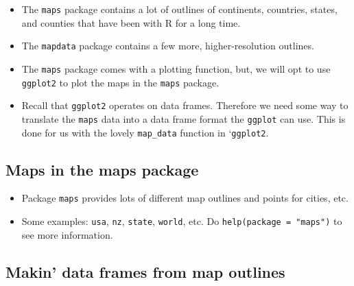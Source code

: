 \documentclass[]{book}
\providecommand{\tightlist}{%
  \setlength{\itemsep}{0pt}\setlength{\parskip}{0pt}}
\theoremstyle{definition}
\theoremstyle{definition}
\theoremstyle{remark}
\begin{document}
\begin{itemize}
\tightlist
\item
  The \texttt{maps} package contains a lot of outlines of continents,
  countries, states, and counties that have been with R for a long
  time.\\
\item
  The \texttt{mapdata} package contains a few more, higher-resolution
  outlines.
\item
  The \texttt{maps} package comes with a plotting function, but, we will
  opt to use \texttt{ggplot2} to plot the maps in the \texttt{maps}
  package.\\
\item
  Recall that \texttt{ggplot2} operates on data frames. Therefore we
  need some way to translate the \texttt{maps} data into a data frame
  format the \texttt{ggplot} can use. This is done for us with the
  lovely \texttt{map\_data} function in `\texttt{ggplot2}.
\end{itemize}

\subsection{Maps in the maps package}\label{maps-in-the-maps-package}

\begin{itemize}
\tightlist
\item
  Package \texttt{maps} provides lots of different map outlines and
  points for cities, etc.\\
\item
  Some examples: \texttt{usa}, \texttt{nz}, \texttt{state},
  \texttt{world}, etc. Do \texttt{help(package\ =\ "maps")} to see more
  information.
\end{itemize}

\subsection{Makin' data frames from map
outlines}\label{makin-data-frames-from-map-outlines}
\end{document}
